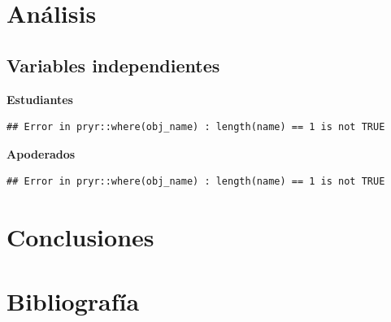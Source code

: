 \documentclass[12pt,twoside]{templates/facsothesis}
\begin{document}
\hypertarget{anuxe1lisis}{%
\chapter{Análisis}\label{anuxe1lisis}}

\hypertarget{variables-independientes}{%
\section{Variables independientes}\label{variables-independientes}}

\textbf{Estudiantes}

\begin{verbatim}
## Error in pryr::where(obj_name) : length(name) == 1 is not TRUE
\end{verbatim}

\textbf{Apoderados}

\begin{verbatim}
## Error in pryr::where(obj_name) : length(name) == 1 is not TRUE
\end{verbatim}

\hypertarget{conclusiones}{%
\chapter{Conclusiones}\label{conclusiones}}

\hypertarget{bibliografuxeda}{%
\chapter*{Bibliografía}\label{bibliografuxeda}}



\end{document}
